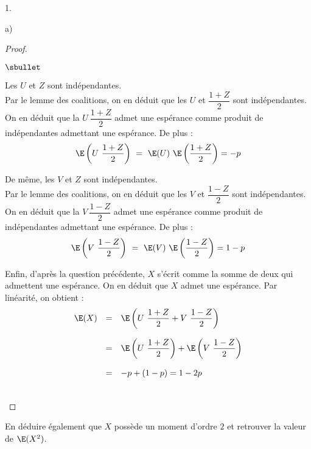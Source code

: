 \documentclass[11pt]{article}%
\begin{document}
\begin{noliste}{1.}
\begin{noliste}{a)}
\begin{proof}
\begin{noliste}{$\sbullet$}
      \item Les \var $U$ et $Z$ sont indépendantes.\\
        Par le lemme des coalitions, on en déduit que les \var $U$ et
        $\dfrac{1+Z}{2}$ sont indépendantes.\\
        On en déduit que la \var $U \ \dfrac{1+Z}{2}$ admet une
        espérance comme produit de \var indépendantes admettant une
        espérance. De plus : 
        \[
        \E\left(U \ \dfrac{1+Z}{2}\right) \ = \ \E(U) \
        \E\left(\dfrac{1+Z}{2}\right) = - p
        \]

      \item De même, les \var $V$ et $Z$ sont indépendantes.\\
        Par le lemme des coalitions, on en déduit que les \var $V$ et
        $\dfrac{1-Z}{2}$ sont indépendantes.\\
        On en déduit que la \var $V \ \dfrac{1-Z}{2}$ admet une
        espérance comme produit de \var indépendantes admettant une
        espérance. De plus : 
        \[
        \E\left(V \ \dfrac{1-Z}{2}\right) \ = \ \E(V) \
        \E\left(\dfrac{1-Z}{2}\right) = 1-p
        \]

      \item Enfin, d'après la question précédente, $X$ s'écrit comme
        la somme de deux \var qui admettent une espérance. On en
        déduit que $X$ admet une espérance. Par linéarité, on obtient
        :
        \[
        \begin{array}{rcl}
          \E(X) & = & \E\left(U \ \dfrac{1+Z}{2} + V \ \dfrac{1-Z}{2}
          \right)  
          \\[.6cm]
          & = & \E\left(U \ \dfrac{1+Z}{2}\right) + \E\left(V \
            \dfrac{1-Z}{2}\right) 
          \\[.6cm]
          & = & - p + (1-p) = 1-2p
        \end{array}
        \]
      \end{noliste}
      ~\\[-1.2cm]
    \end{proof}	    




  \item En déduire également que $X$ possède un moment d'ordre $2$ et
    retrouver la valeur de $\E(X^{2})$.


\end{noliste}
\end{noliste}
\end{document}
